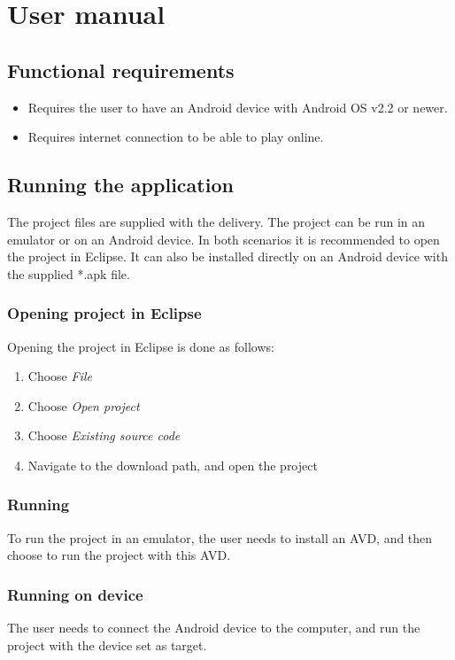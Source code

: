 \section{User manual}

\subsection{Functional requirements}
\begin{itemize}
\item Requires the user to have an Android device with Android OS v2.2 or newer.
\item Requires internet connection to be able to play online.
\end{itemize}

\subsection{Running the application}
The project files are supplied with the delivery. The project can be run in an emulator or on an Android device. In both scenarios it is recommended to open the project in Eclipse. It can also be installed directly on an Android device with the supplied *.apk file.

\subsubsection{Opening project in Eclipse}
Opening the project in Eclipse is done as follows:
\begin{enumerate}
\item Choose \emph{File}
\item Choose \emph{Open project}
\item Choose \emph{Existing source code}
\item Navigate to the download path, and open the project
\end{enumerate}

\subsubsection{Running}
To run the project in an emulator, the user needs to install an AVD, and then choose to run the project with this AVD.

\subsubsection{Running on device}
The user needs to connect the Android device to the computer, and run the project with the device set as target.

